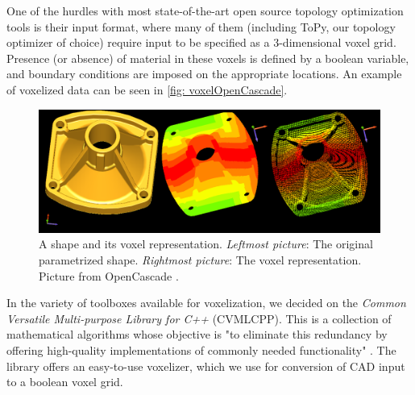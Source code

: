 One of the hurdles with most state-of-the-art open source topology optimization tools is their input format, where many of them (including ToPy, our topology optimizer of choice) require input to be specified as a 3-dimensional voxel grid. Presence (or absence) of material in these voxels is defined by a boolean variable, and boundary conditions are imposed on the appropriate locations. An example of voxelized data can be seen in \autoref{fig: voxelOpenCascade}. %
\begin{figure}
\centering
  \includegraphics[scale=0.3]{Pictures/CADToVoxel/voxels_wp_image005.png}
\caption{A shape and its voxel representation. \emph{Leftmost picture}: The original parametrized shape. \emph{Rightmost picture}: The voxel representation. Picture from OpenCascade \cite{OpenCascade}.}
\label{fig: voxelOpenCascade}
\end{figure}
In the variety of toolboxes available for voxelization, we decided on the \emph{Common Versatile Multi-purpose Library for C++} (CVMLCPP). This is a collection of mathematical algorithms whose objective is "to eliminate this redundancy by offering high-quality implementations of commonly needed functionality" \cite{CVMLCPP}. The library offers an easy-to-use voxelizer, which we use for conversion of CAD input to a boolean voxel grid.

